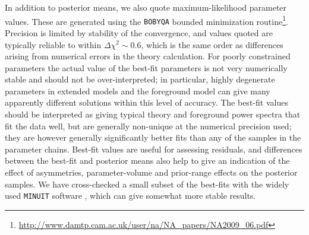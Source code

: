 In addition to posterior means, we also quote maximum-likelihood
parameter values. These are generated using the {\tt BOBYQA} bounded
minimization
routine\footnote{\url{http://www.damtp.cam.ac.uk/user/na/NA_papers/NA2009_06.pdf}}.
Precision is limited by stability of the convergence, and values
quoted are typically reliable to within $\Delta \chi^2 \sim 0.6$,
which is the same order as differences arising from numerical errors
in the theory calculation.  For poorly constrained parameters the
actual value of the best-fit parameters is not very numerically stable
and should not be over-interpreted; in particular, highly degenerate
parameters in extended models and the foreground model can give many
apparently different solutions within this level of
accuracy.  The best-fit values should be interpreted as giving typical
theory and foreground power spectra that fit the data well, but are
generally non-unique at the numerical precision used; they are however
generally significantly better fits than any of the samples in the
parameter chains.  Best-fit values are useful for assessing residuals,
and differences between the best-fit and posterior means also help to
give an indication of the effect of asymmetries, parameter-volume and
prior-range effects on the posterior samples. We have cross-checked a
small subset of the best-fits with the widely used {\tt MINUIT}
software \citep{Minuit}, which can give somewhat more stable results.


